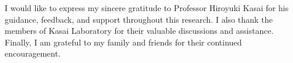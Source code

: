 \begin{acknowledgment}
I would like to express my sincere gratitude to Professor Hiroyuki Kasai for his guidance,
feedback, and support throughout this research. I also thank the members of Kasai Laboratory for
their valuable discussions and assistance. Finally, I am grateful to my family and friends for
their continued encouragement.
\end{acknowledgment}
